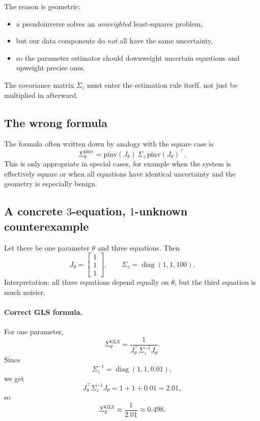 \documentclass[11pt]{article}
\begin{document}
The reason is geometric:
\begin{itemize}
    \item a pseudoinverse solves an \emph{unweighted} least-squares problem,
    \item but our data components do \emph{not} all have the same uncertainty,
    \item so the parameter estimator should downweight uncertain equations and upweight precise ones.
\end{itemize}

The covariance matrix $\Sigma_z$ must enter the estimation rule itself, not just be multiplied in afterward.

\subsection*{The wrong formula}
The formula often written down by analogy with the square case is
\[
\Sigma_\theta^{\mathrm{pinv}} =
\mathrm{pinv}(J_\theta)\,\Sigma_z\,\mathrm{pinv}(J_\theta)^\top.
\]
This is only appropriate in special cases, for example when the system is effectively square or when all equations have identical uncertainty and the geometry is especially benign.

\subsection*{A concrete $3$-equation, $1$-unknown counterexample}
Let there be one parameter $\theta$ and three equations. Then
\[
J_\theta =
\begin{bmatrix}
1\\
1\\
1
\end{bmatrix},
\qquad
\Sigma_z = \operatorname{diag}(1,1,100).
\]
Interpretation: all three equations depend equally on $\theta$, but the third equation is much noisier.

\paragraph{Correct GLS formula.}
For one parameter,
\[
\Sigma_\theta^{\mathrm{GLS}} = \frac{1}{J_\theta^\top \Sigma_z^{-1} J_\theta}.
\]
Since
\[
\Sigma_z^{-1} = \operatorname{diag}(1,1,0.01),
\]
we get
\[
J_\theta^\top \Sigma_z^{-1} J_\theta = 1+1+0.01 = 2.01,
\]
so
\[
\Sigma_\theta^{\mathrm{GLS}} \approx \frac{1}{2.01} \approx 0.498.
\]
\end{document}
